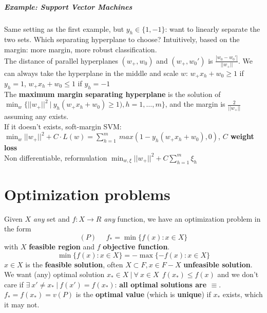 \documentclass[10pt]{report}
\begin{document}
\subparagraph{Example: Support Vector Machines} Same setting as the first example, but $y_h\in\{1,-1\}$: want to linearly separate the two sets. Which separating hyperplane to choose? Intuitively, based on the margin: more margin, more robust classification.\\
The distance of parallel hyperplanes $(w_+, w_0)$ and $(w_+, w_0')$ is $\frac{|w_0 - w_0'|}{||w_+||}$. We can always take the hyperplane in the middle and scale $w$: $w_+x_h + w_0 \geq 1$ if $y_h = 1$, $w_+x_h + w_0 \leq 1$ if $y_h = -1$\\
The \textbf{maximum margin separating hyperplane} is the solution of $\min_w\{||w_+||^2\:|\:y_h(w_+x_h + w_0)\geq 1), h=1,\ldots,m\}$, and the margin is $\frac{2}{||w_+||}$ assuming any exists.\\
If it doesn't exists, soft-margin SVM: $\min_w ||w_+||^2 + C\cdot L(w) = \sum_{h=1}^m\:max(1-y_h(w_+x_h + w_0), 0)$, \textbf{$C$ weight loss}\\
Non differentiable, reformulation $\min_{w,\xi} ||w_+||^2 + C\sum_{h=1}^m \xi_h$
\pagebreak
\section{Optimization problems}
Given $X$ \textit{any} set and $f:X\rightarrow R$ \textit{any} function, we have an optimization problem in the form $$(P)\:\:\:\:\:\:f_*=\min\{f(x) : x\in X\}$$
with $X$ \textbf{feasible region} and $f$ \textbf{objective function}.
$$\min\{f(x) : x\in X\} = -\max\{-f(x) : x\in X\}$$
$x\in X$ is the \textbf{feasible solution}, often $X\subset F, x\in F-X$ \textbf{unfeasible solution}. We want (any) optimal solution $x_* \in X\:|\:\forall\:x\in X\:\:f(x_*)\leq f(x)$ and we don't care if $\exists\:x'\neq x_*\:|\:f(x')=f(x_*)$: \textbf{all optimal solutions are $\equiv$}. $f_* = f(x_*) = v(P)$ is the \textbf{optimal value} (which is \textbf{unique}) if $x_*$ exists, which it may not.
\end{document}
